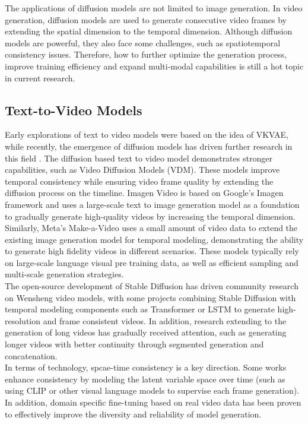 \indent The applications of diffusion models are not limited to image generation. In video generation, diffusion models are used to generate consecutive video frames by extending the spatial dimension to the temporal dimension. Although diffusion models are powerful, they also face some challenges, such as spatiotemporal consistency issues. Therefore, how to further optimize the generation process, improve training efficiency and expand multi-modal capabilities is still a hot topic in current research.

\subsection{Text-to-Video Models}
Early explorations of text to video models \cite{hong2022cogvideo,villegas2022phenaki} were based on the idea of VKVAE, while recently, the emergence of diffusion models \cite{ho2020denoising,rombach2022high} has driven further research in this field \cite{an2023latent}. The diffusion based text to video model demonstrates stronger capabilities, such as Video Diffusion Models (VDM). These models improve temporal consistency while ensuring video frame quality by extending the diffusion process on the timeline. Imagen Video \cite{an2023latent} is based on Google's Imagen framework and uses a large-scale text to image generation model as a foundation to gradually generate high-quality videos by increasing the temporal dimension. Similarly, Meta's Make-a-Video \cite{singer2022make} uses a small amount of video data to extend the existing image generation model for temporal modeling, demonstrating the ability to generate high fidelity videos in different scenarios. These models typically rely on large-scale language visual pre training data, as well as efficient sampling and multi-scale generation strategies.\\
\indent The open-source development of Stable Diffusion has driven community research on Wensheng video models, with some projects combining Stable Diffusion with temporal modeling components such as Transformer or LSTM to generate high-resolution and frame consistent videos. In addition, research extending to the generation of long videos has gradually received attention, such as generating longer videos with better continuity through segmented generation and concatenation.\\
\indent In terms of technology, spcae-time consistency is a key direction. Some works enhance consistency by modeling the latent variable space over time (such as using CLIP or other visual language models to supervise each frame generation). In addition, domain specific fine-tuning based on real video data has been proven to effectively improve the diversity and reliability of model generation.

